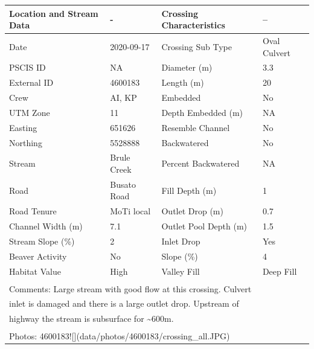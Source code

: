 \documentclass[
]{book}
\begin{document}
\begin{tabular}{llll}
\toprule
Location and Stream Data & - & Crossing Characteristics & --\\
\midrule
Date & 2020-09-17 & Crossing Sub Type & Oval Culvert\\
PSCIS ID & NA & Diameter (m) & 3.3\\
External ID & 4600183 & Length (m) & 20\\
Crew & AI, KP & Embedded & No\\
UTM Zone & 11 & Depth Embedded (m) & NA\\
\addlinespace
Easting & 651626 & Resemble Channel & No\\
Northing & 5528888 & Backwatered & No\\
Stream & Brule Creek & Percent Backwatered & NA\\
Road & Busato Road & Fill Depth (m) & 1\\
Road Tenure & MoTi local & Outlet Drop (m) & 0.7\\
\addlinespace
Channel Width (m) & 7.1 & Outlet Pool Depth (m) & 1.5\\
Stream Slope (\%) & 2 & Inlet Drop & Yes\\
Beaver Activity & No & Slope (\%) & 4\\
Habitat Value & High & Valley Fill & Deep Fill\\
\bottomrule
\multicolumn{4}{l}{\textsuperscript{} Comments: Large stream with good flow at this crossing. Culvert}\\
\multicolumn{4}{l}{inlet is damaged and there is a large outlet drop. Upstream of}\\
\multicolumn{4}{l}{highway the stream is subsurface for \textasciitilde{}600m.}\\
\multicolumn{4}{l}{\textsuperscript{} Photos: 4600183![](data/photos/4600183/crossing\_all.JPG)}\\
\end{tabular}
\end{document}
